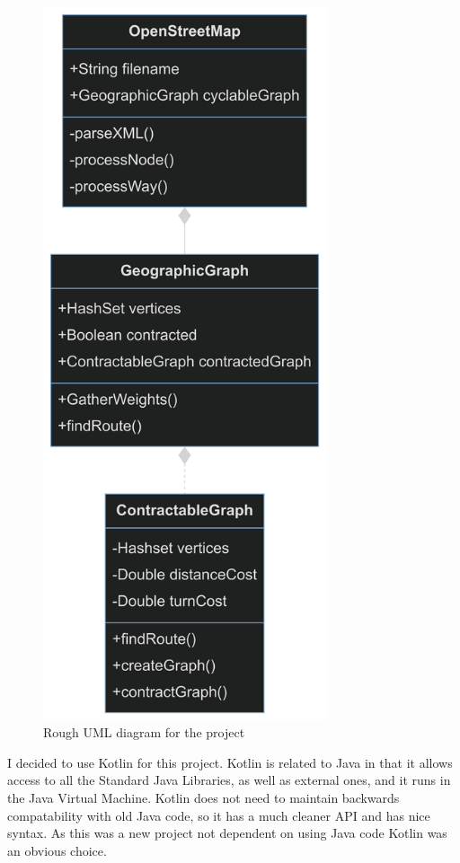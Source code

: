 \documentclass[11pt,twoside,a4paper]{article}
\begin{document}
\begin{figure}[p]
    \begin{center}
        \includegraphics[height=21cm]{classdiagram.png}
    \end{center}
    \caption{Rough UML diagram for the project}
    \label{uml}
\end{figure}
I decided to use Kotlin for this project. Kotlin is related to Java in that it allows access to all the Standard Java Libraries, as well
as external ones, and it runs in the Java Virtual Machine. Kotlin does not need to maintain backwards compatability with old Java code,
so it has a much cleaner API and has nice syntax. As this was a new project not dependent on using Java code Kotlin was an obvious choice. 
\end{document}
